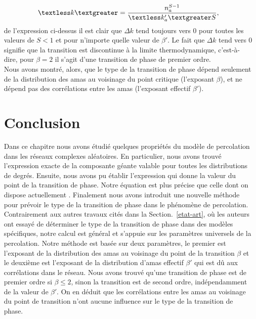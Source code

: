 \begin{equation}
\km=\frac{n_a^{S-1}}{\kmap S},
\end{equation}
de l'expression ci-dessus il est clair que  $\Delta k$  tend toujours vers $0$ pour toutes les valeurs de $S<1$ et pour n'importe quelle valeur de $\beta'$. Le fait que $\Delta k$ tend vers $0$  signifie que la transition est discontinue à la limite thermodynamique, c'est-à-dire, pour $\beta=2$ il s'agit d'une transition de phase de premier ordre.\\
Nous avons montré, alors, que le type de la transition de phase dépend seulement de la distribution des amas au voisinage du point critique (l'exposant $\beta$), et ne dépend pas des corrélations entre les amas (l'exposant effectif $\beta'$). \\ 
\section{Conclusion}
Dans ce chapitre nous avons étudié quelques propriétés du modèle de percolation dans les réseaux complexes aléatoires. En particulier, nous avons trouvé l'expression exacte de la composante géante valable pour toutes les distributions de degrés. Ensuite, nous avons pu établir l'expression qui donne la valeur du point de la transition de phase. Notre équation est plus précise que celle dont on dispose actuellement \cite{Cho-al2010}. Finalement nous avons introduit une nouvelle méthode pour prévoir le type de la transition de phase dans le phénomène de percolation. Contrairement aux autres travaux cités dans la  Section.~\ref{etat-art}, où les auteurs ont essayé de déterminer le type de la transition de phase dans des modèles spécifiques, notre calcul est général et s'appuie sur les paramètres universels de la percolation.  Notre méthode est basée sur deux paramètres, le premier est l'exposant de la distribution des amas au voisinage du point de la transition $\beta$ et le deuxième est l'exposant de la distribution d'amas  effectif $\beta'$ qui est dû aux corrélations dans le réseau. Nous avons trouvé qu'une transition de phase est de premier ordre si $\beta\leq2$, sinon la transition est de second ordre, indépendamment de la valeur de $\beta'$. On en déduit que les corrélations entre les amas au voisinage du point de transition n'ont aucune influence sur le type de la transition de phase.

\let\cleardoublepage\clearpage
